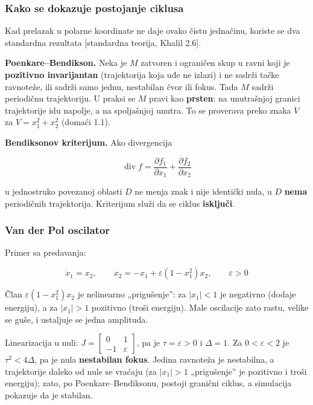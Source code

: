 \documentclass[11pt,a4paper,parskip=half,headsepline,numbers=noenddot]{scrartcl}
\DeclareRobustCommand{\izvor}[1]{{\small\color{izvorC}[#1]}}
\begin{document}
\subsubsection{Kako se dokazuje postojanje ciklusa}

Kad prelazak u polarne koordinate ne daje ovako čistu jednačinu, koriste se dva standardna rezultata \izvor{standardna teorija, Khalil 2.6}.

\textbf{Poenkare--Bendikson.} Neka je \(M\) zatvoren i ograničen skup u ravni koji je \textbf{pozitivno invarijantan} (trajektorija koja uđe ne izlazi) i ne sadrži tačke ravnoteže, ili sadrži samo jednu, nestabilan čvor ili fokus. Tada \(M\) sadrži periodičnu trajektoriju. U praksi se \(M\) pravi kao \textbf{prsten}: na unutrašnjoj granici trajektorije idu napolje, a na spoljašnjoj unutra. To se proverava preko znaka \(\dot V\) za \(V = x_1^2 + x_2^2\) (domaći 1.1).

\textbf{Bendiksonov kriterijum.} Ako divergencija

\[\operatorname{div} f = \frac{\partial f_1}{\partial x_1} + \frac{\partial f_2}{\partial x_2}\]

u jednostruko povezanoj oblasti \(D\) ne menja znak i nije identički nula, u \(D\) \textbf{nema} periodičnih trajektorija. Kriterijum služi da se ciklus \textbf{isključi}.

\subsubsection{Van der Pol oscilator}

Primer sa predavanja:

\[\dot x_1 = x_2, \qquad \dot x_2 = -x_1 + \varepsilon(1 - x_1^2)x_2, \qquad \varepsilon > 0\]

Član \(\varepsilon(1 - x_1^2)x_2\) je nelinearno „prigušenje'': za \(|x_1| < 1\) je negativno (dodaje energiju), a za \(|x_1| > 1\) pozitivno (troši energiju). Male oscilacije zato rastu, velike se guše, i ustaljuje se jedna amplituda.

Linearizacija u nuli: \(J = \begin{bmatrix}0 & 1\\ -1 & \varepsilon\end{bmatrix}\), pa je \(\tau = \varepsilon > 0\) i \(\Delta = 1\). Za \(0 < \varepsilon < 2\) je \(\tau^2 < 4\Delta\), pa je nula \textbf{nestabilan fokus}. Jedina ravnoteža je nestabilna, a trajektorije daleko od nule se vraćaju (za \(|x_1| > 1\) „prigušenje'' je pozitivno i troši energiju); zato, po Poenkare--Bendiksonu, postoji granični ciklus, a simulacija pokazuje da je stabilan.
\end{document}
